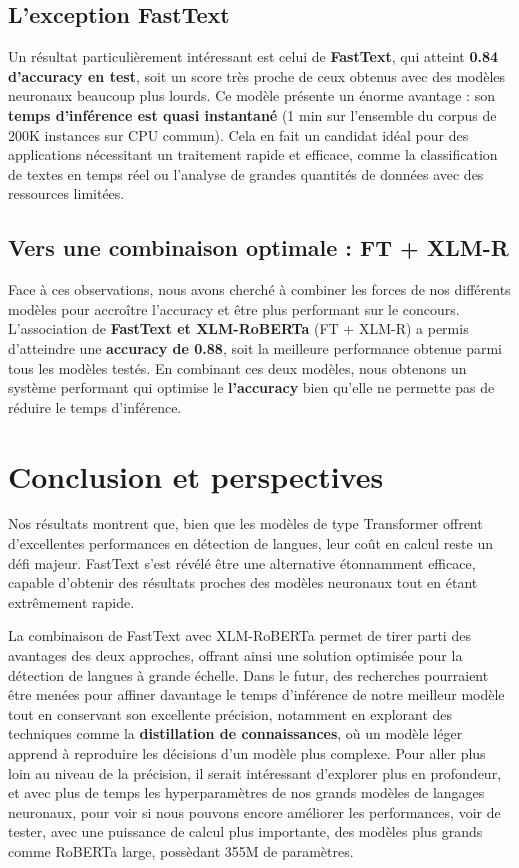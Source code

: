 \subsection{L'exception FastText}

Un résultat particulièrement intéressant est celui de \textbf{FastText}, qui atteint \textbf{0.84 d'accuracy en test}, soit un score très proche de ceux obtenus avec des modèles neuronaux beaucoup plus lourds. Ce modèle présente un énorme avantage : son \textbf{temps d'inférence est quasi instantané} (1 min sur l’ensemble du corpus de 200K instances sur CPU commun). Cela en fait un candidat idéal pour des applications nécessitant un traitement rapide et efficace, comme la classification de textes en temps réel ou l’analyse de grandes quantités de données avec des ressources limitées.

\subsection{Vers une combinaison optimale : FT + XLM-R}

Face à ces observations, nous avons cherché à combiner les forces de nos différents modèles pour accroître l'accuracy et être plus performant sur le concours. L’association de \textbf{FastText et XLM-RoBERTa} (FT + XLM-R) a permis d’atteindre une \textbf{accuracy de 0.88}, soit la meilleure performance obtenue parmi tous les modèles testés.
En combinant ces deux modèles, nous obtenons un système performant qui optimise le \textbf{l'accuracy} bien qu'elle ne permette pas de réduire le temps d'inférence.

\section{Conclusion et perspectives}

Nos résultats montrent que, bien que les modèles de type Transformer offrent d’excellentes performances en détection de langues, leur coût en calcul reste un défi majeur. FastText s’est révélé être une alternative étonnamment efficace, capable d’obtenir des résultats proches des modèles neuronaux tout en étant extrêmement rapide.

La combinaison de FastText avec XLM-RoBERTa permet de tirer parti des avantages des deux approches, offrant ainsi une solution optimisée pour la détection de langues à grande échelle. Dans le futur, des recherches pourraient être menées pour affiner davantage le temps d'inférence de notre meilleur modèle tout en conservant son excellente précision, notamment en explorant des techniques comme la \textbf{distillation de connaissances}, où un modèle léger apprend à reproduire les décisions d’un modèle plus complexe. 
Pour aller plus loin au niveau de la précision, il serait intéressant d'explorer plus en profondeur, et avec plus de temps les hyperparamètres de nos grands modèles de langages neuronaux, pour voir si nous pouvons encore améliorer les performances, voir de tester, avec une puissance de calcul plus importante, des modèles plus grands comme RoBERTa large, possèdant 355M de paramètres.

